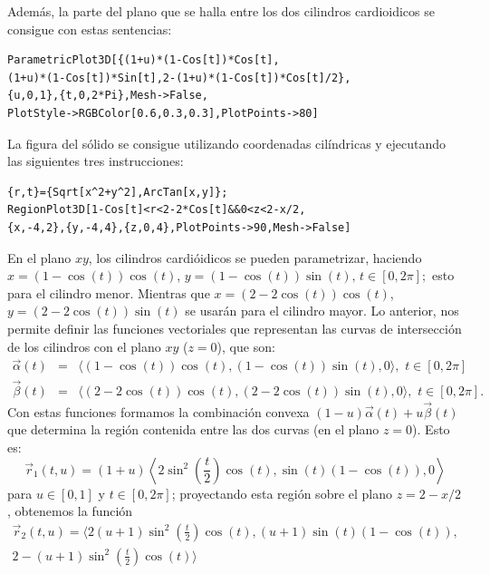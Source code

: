 Además, la parte del plano que se halla entre los dos cilindros cardioidicos se consigue con estas sentencias:

\begin{tcolorbox}[title=\bf Instrucción en \verb"Mathematica"]\begin{Verbatim}[formatcom=\letraverbatim]
ParametricPlot3D[{(1+u)*(1-Cos[t])*Cos[t],
(1+u)*(1-Cos[t])*Sin[t],2-(1+u)*(1-Cos[t])*Cos[t]/2},
{u,0,1},{t,0,2*Pi},Mesh->False,
PlotStyle->RGBColor[0.6,0.3,0.3],PlotPoints->80]
\end{Verbatim}
\end{tcolorbox}

La figura del sólido se consigue utilizando coordenadas cilíndricas y ejecutando las siguientes tres instrucciones:

\begin{tcolorbox}[title=\bf Instrucción en \verb"Mathematica"]\begin{Verbatim}[formatcom=\letraverbatim]
{r,t}={Sqrt[x^2+y^2],ArcTan[x,y]};
RegionPlot3D[1-Cos[t]<r<2-2*Cos[t]&&0<z<2-x/2,
{x,-4,2},{y,-4,4},{z,0,4},PlotPoints->90,Mesh->False]
\end{Verbatim}
\end{tcolorbox}

En el plano $xy$, los cilindros cardióidicos se pueden parametrizar, haciendo
$x = (1 -\cos(t))\cos(t)$, $y = (1 - \cos(t)) \sin(t),\,t \in[0, 2\pi];$ esto para el cilindro menor. Mientras que $x = (2 - 2\cos(t))\cos(t)$, $y = (2 - 2\cos(t))\sin(t)$ se usarán para el cilindro mayor.
Lo anterior, nos permite definir las funciones vectoriales que representan las curvas de intersección de los cilindros con el plano $xy$ ($z = 0$), que son:
%
\begin{eqnarray*}
\overrightarrow{\alpha} (t) &=& \langle(1-\cos(t))\cos(t), (1-\cos(t))\sin(t), 0\rangle ,\,\, t \in[0, 2\pi] \\
\overrightarrow{\beta} (t)& = &\langle(2-2\cos(t))\cos(t), (2-2\cos(t))\sin(t), 0\rangle ,\,\, t \in[0, 2\pi].
\end{eqnarray*}
%
Con estas funciones formamos la combinación convexa $(1-u)\overrightarrow{\alpha}(t)+u\overrightarrow{\beta}(t)$que determina la región contenida entre las dos curvas (en el plano $z=0$). Esto es:
%
{\small
\begin{equation}\label{36a}
\overrightarrow{r}_1(t,u)=(1+u)\left\langle 2 \sin ^2\left(\frac{t}{2}\right) \cos (t),\sin (t) (1-\cos (t)),0 \right\rangle
\end{equation}
}
%
para $u\in[0, 1]$ y $t \in[0, 2\pi]$; proyectando esta región sobre el plano $z=2-x/2$, obtenemos la función
{\small
\begin{eqnarray}
\overrightarrow{r}_2(t,u)=\bigg\langle 2 (u+1) \sin ^2\left(\frac{t}{2}\right) \cos(t),(u+1) \sin (t) (1-\cos (t)),\nonumber\\
2-(u+1) \sin^2\left(\frac{t}{2}\right) \cos (t) \bigg\rangle \label{36b}
\end{eqnarray}
}

